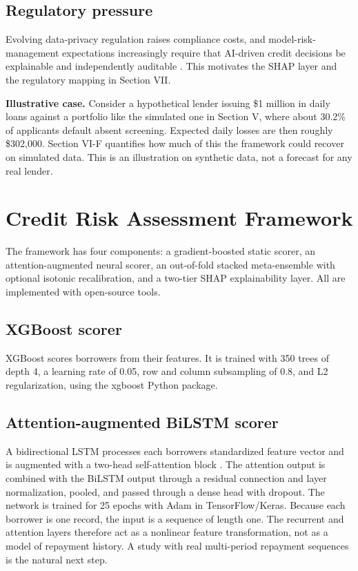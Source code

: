 \documentclass[conference,a4paper]{IEEEtran}
\begin{document}
\subsection{Regulatory pressure}

Evolving data-privacy regulation raises compliance costs, and model-risk-management expectations increasingly require that AI-driven credit decisions be explainable and independently auditable \cite{r4,r19,r20}. This motivates the SHAP layer and the regulatory mapping in Section VII.

\textbf{Illustrative case.} Consider a hypothetical lender issuing \$1 million in daily loans against a portfolio like the simulated one in Section V, where about 30.2\% of applicants default absent screening. Expected daily losses are then roughly \$302,000. Section VI-F quantifies how much of this the framework could recover on simulated data. This is an illustration on synthetic data, not a forecast for any real lender.

\section{Credit Risk Assessment Framework}

The framework has four components: a gradient-boosted static scorer, an attention-augmented neural scorer, an out-of-fold stacked meta-ensemble with optional isotonic recalibration, and a two-tier SHAP explainability layer. All are implemented with open-source tools.

\subsection{XGBoost scorer}

XGBoost \cite{r2} scores borrowers from their features. It is trained with 350 trees of depth 4, a learning rate of 0.05, row and column subsampling of 0.8, and L2 regularization, using the xgboost Python package.

\subsection{Attention-augmented BiLSTM scorer}

A bidirectional LSTM \cite{r1} processes each borrower\textquotesingle s standardized feature vector and is augmented with a two-head self-attention block \cite{r3}. The attention output is combined with the BiLSTM output through a residual connection and layer normalization, pooled, and passed through a dense head with dropout. The network is trained for 25 epochs with Adam in TensorFlow/Keras. Because each borrower is one record, the input is a sequence of length one. The recurrent and attention layers therefore act as a nonlinear feature transformation, not as a model of repayment history. A study with real multi-period repayment sequences is the natural next step.
\end{document}
